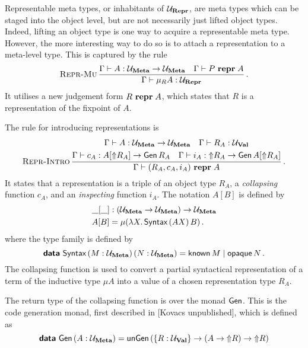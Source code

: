 Representable meta types, or inhabitants of $\Ur$, are meta types which can be
staged into the object level, but are not necessarily just lifted object types.
Indeed, lifting an object type is one way to acquire a representable meta type.
However, the more interesting way to do so is to attach a representation to a
meta-level type. This is captured by the rule
\[
  \infrule[Repr-Mu]{\Gamma \vdash A : \Um \to \Um \quad \Gamma \vdash \isrepr{P}{A}}
  {\Gamma \vdash \mu_R A : \Ur} \,.
\]
It utilises a new judgement form $\isrepr{R}{A}$, which states that $R$ is a
representation of the fixpoint of $A$.

The rule for introducing representations is
\[
  \infrule[Repr-Intro]{
    \begin{gathered}
      \Gamma \vdash A : \Um \to \Um \quad
      \Gamma \vdash R_A : \Uv                                \\
      \Gamma \vdash c_A : A [\lift{R_A}] \to \Gen \, R_A \quad
      \Gamma \vdash i_A : \lift{R_A} \to \Gen \, A [\lift{R_A}]
    \end{gathered}
  }{\Gamma \vdash \isrepr{(R_A, c_A, i_A)}{A}} \,.
\]
It states that a representation is a triple of an object type $R_A$, a
\emph{collapsing} function $c_A$, and an \emph{inspecting} function $i_A$. The
notation $A[B]$ is defined by
\begin{align*}
   & \wildp[\wildp] : (\Um \to \Um) \to \Um                                 \\
   & A[B] =           \mu (\lambda X . \, \defin{Syntax} \, (A X) \, B) \,.
\end{align*}
where the  type family is defined by
\[
  \data{Syntax} \,(M : \Um)\,(N : \Um) = \defin{known} \, M \mid \defin{opaque} \, N \,.
\]
The collapsing function is used to convert a partial syntactical representation
of a term of the inductive type $\mu A$ into a value of a chosen representation
type $R_A$.

The return type of the collapsing function is over the monad $\Gen$. This is
the code generation monad, first described in [Kovacs unpublished], which is
defined as
\[
  \data{Gen} \, (A : \Um) = \defin{unGen} \, (\{ R : \Uv \} \to (A \to \lift R) \to \lift R)
\]

